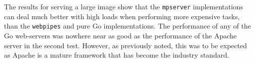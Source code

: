 The results for serving a large image show that the \texttt{mpserver} implementations can deal
much better with high loads when performing more expensive tasks, than the \texttt{webpipes} and
pure Go implementations. The performance of any of the Go web-servers was nowhere near as good
as the performance of the Apache server in the second test. However, as previously noted, this was to 
be expected as Apache is a mature framework that has become the industry standard.